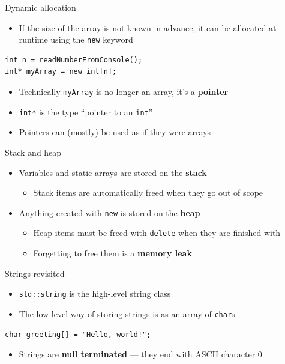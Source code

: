 \begin{frame}[fragile]{Dynamic allocation}
    \begin{itemize}
        \item If the size of the array is not known in advance, it can be allocated at runtime
            using the \lstinline{new} keyword
    \end{itemize}
    \begin{lstlisting}
int n = readNumberFromConsole();
int* myArray = new int[n];
    \end{lstlisting}
    \pause
    \begin{itemize}
        \item Technically \lstinline{myArray} is no longer an array, it's a \textbf{pointer} \pause
        \item \lstinline{int*} is the type ``pointer to an \lstinline{int}'' \pause
        \item Pointers can (mostly) be used as if they were arrays
    \end{itemize}
\end{frame}

\begin{frame}[fragile]{Stack and heap}
    \begin{itemize}
        \item Variables and static arrays are stored on the \textbf{stack} \pause
        \begin{itemize}
            \item Stack items are automatically freed when they go out of scope \pause
        \end{itemize}
        \item Anything created with \lstinline{new} is stored on the \textbf{heap} \pause
        \begin{itemize}
            \item Heap items must be freed with \lstinline{delete} when they are finished with \pause
            \item Forgetting to free them is a \textbf{memory leak}
        \end{itemize}
    \end{itemize}
\end{frame}

\begin{frame}[fragile]{Strings revisited}
    \begin{itemize}
        \item \lstinline{std::string} is the high-level string class \pause
        \item The low-level way of storing strings is as an array of \lstinline{char}s \pause
    \end{itemize}
    \begin{lstlisting}
char greeting[] = "Hello, world!";
    \end{lstlisting}
    \begin{itemize}
        \item Strings are \textbf{null terminated} --- they end with ASCII character 0
    \end{itemize}
\end{frame}

